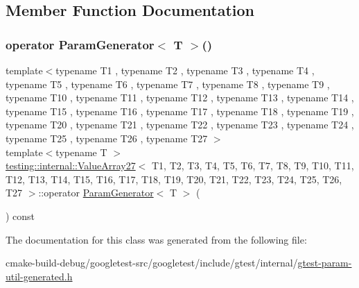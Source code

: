 \subsection{Member Function Documentation}
\mbox{\label{classtesting_1_1internal_1_1ValueArray27_af120f76a65da981182ecfaa8846a10bd}} 
\subsubsection{\texorpdfstring{operator ParamGenerator$<$ T $>$()}{operator ParamGenerator< T >()}}
{\footnotesize\ttfamily template$<$typename T1 , typename T2 , typename T3 , typename T4 , typename T5 , typename T6 , typename T7 , typename T8 , typename T9 , typename T10 , typename T11 , typename T12 , typename T13 , typename T14 , typename T15 , typename T16 , typename T17 , typename T18 , typename T19 , typename T20 , typename T21 , typename T22 , typename T23 , typename T24 , typename T25 , typename T26 , typename T27 $>$ \\
template$<$typename T $>$ \\
\mbox{\hyperlink{classtesting_1_1internal_1_1ValueArray27}{testing\+::internal\+::\+Value\+Array27}}$<$ T1, T2, T3, T4, T5, T6, T7, T8, T9, T10, T11, T12, T13, T14, T15, T16, T17, T18, T19, T20, T21, T22, T23, T24, T25, T26, T27 $>$\+::operator \mbox{\hyperlink{classtesting_1_1internal_1_1ParamGenerator}{Param\+Generator}}$<$ T $>$ (\begin{DoxyParamCaption}{ }\end{DoxyParamCaption}) const\hspace{0.3cm}{\ttfamily [inline]}}



The documentation for this class was generated from the following file\+:\begin{DoxyCompactItemize}
\item 
cmake-\/build-\/debug/googletest-\/src/googletest/include/gtest/internal/\mbox{\hyperlink{gtest-param-util-generated_8h}{gtest-\/param-\/util-\/generated.\+h}}\end{DoxyCompactItemize}
